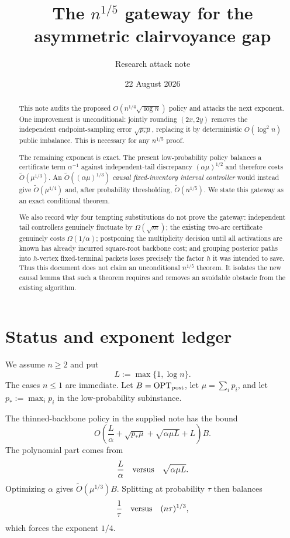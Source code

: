 \documentclass[11pt]{article}
\title{The $n^{1/5}$ gateway for the asymmetric clairvoyance gap}
\author{Research attack note}
\date{22 August 2026}
\theoremstyle{remark}
\newcommand{\opt}{\operatorname{OPT}}
\begin{document}
\maketitle

\begin{abstract}
This note audits the proposed $O(n^{1/4}\sqrt{\log n})$ policy and attacks
the next exponent.  One improvement is unconditional: jointly rounding
$(2x,2y)$ removes the independent endpoint-sampling error
$\sqrt{p_*\mu}$, replacing it by deterministic $O(\log^2 n)$ public
imbalance.  This is necessary for any $n^{1/5}$ proof.

The remaining exponent is exact.  The present low-probability policy balances
a certificate term $\alpha^{-1}$ against independent-tail discrepancy
$(\alpha\mu)^{1/2}$ and therefore costs $\widetilde O(\mu^{1/3})$.
An $\widetilde O((\alpha\mu)^{1/3})$ \emph{causal fixed-inventory interval
controller} would instead give $\widetilde O(\mu^{1/4})$ and, after
probability thresholding, $\widetilde O(n^{1/5})$.  We state this gateway as
an exact conditional theorem.

We also record why four tempting substitutions do not prove the gateway:
independent tail controllers genuinely fluctuate by $\Omega(\sqrt m)$;
the existing two-arc certificate genuinely costs $\Omega(1/\alpha)$;
postponing the multiplicity decision until all activations are known has
already incurred square-root backbone cost; and grouping posterior paths
into $h$-vertex fixed-terminal packets loses precisely the factor $h$ it was
intended to save.  Thus this document does not claim an unconditional
$n^{1/5}$ theorem.  It isolates the new causal lemma that such a theorem
requires and removes an avoidable obstacle from the existing algorithm.
\end{abstract}

\section{Status and exponent ledger}

We assume $n\ge2$ and put
\[
  L:=\max\{1,\log n\}.
\]
The cases $n\le1$ are immediate.  Let $B=\opt_{\rm post}$, let
$\mu=\sum_i p_i$, and let $p_*:=\max_i p_i$ in the low-probability
subinstance.

The thinned-backbone policy in the supplied note has the bound
\begin{equation}\label{eq:old-low}
 O\!\left(
   \frac L\alpha+\sqrt{p_*\mu}
   +\sqrt{\alpha\mu L}+L
 \right)B.
\end{equation}
The polynomial part comes from
\[
  \frac L\alpha
  \quad\hbox{versus}\quad
  \sqrt{\alpha\mu L}.
\]
Optimizing $\alpha$ gives $\widetilde O(\mu^{1/3})B$.  Splitting at
probability $\tau$ then balances
\[
  \frac1\tau
  \quad\hbox{versus}\quad
  (n\tau)^{1/3},
\]
which forces the exponent $1/4$.
\end{document}
